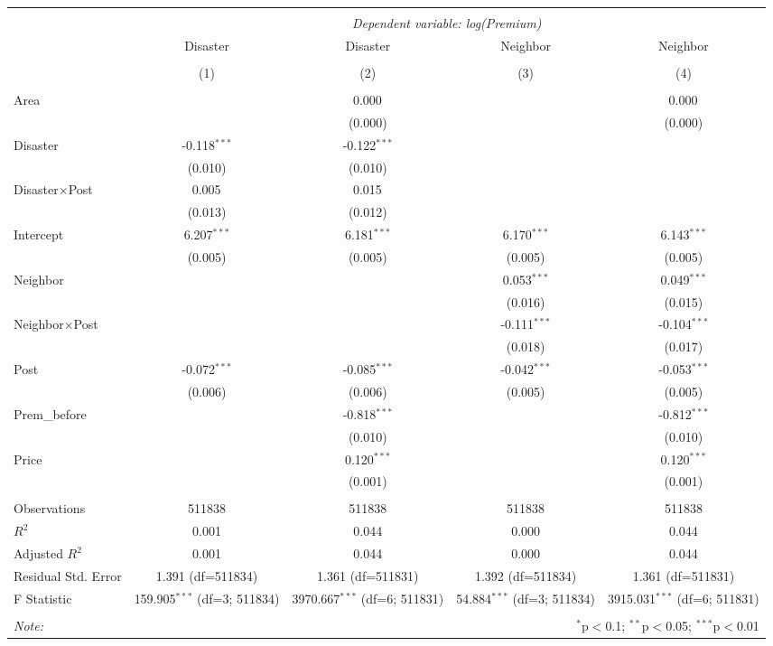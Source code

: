 
\begin{tabular}{@{\extracolsep{5pt}}lcccc}
\\[-1.8ex]\hline
\hline \\[-1.8ex]
& \multicolumn{4}{c}{\textit{Dependent variable: log(Premium)}} \
\cr \cline{2-5}
\\[-1.8ex] & \multicolumn{1}{c}{Disaster} & \multicolumn{1}{c}{Disaster} & \multicolumn{1}{c}{Neighbor} & \multicolumn{1}{c}{Neighbor}  \\
\\[-1.8ex] & (1) & (2) & (3) & (4) \\
\hline \\[-1.8ex]
 Area & & 0.000$^{}$ & & 0.000$^{}$ \\
& & (0.000) & & (0.000) \\
 Disaster & -0.118$^{***}$ & -0.122$^{***}$ & & \\
& (0.010) & (0.010) & & \\
 Disaster$\times$Post & 0.005$^{}$ & 0.015$^{}$ & & \\
& (0.013) & (0.012) & & \\
 Intercept & 6.207$^{***}$ & 6.181$^{***}$ & 6.170$^{***}$ & 6.143$^{***}$ \\
& (0.005) & (0.005) & (0.005) & (0.005) \\
 Neighbor & & & 0.053$^{***}$ & 0.049$^{***}$ \\
& & & (0.016) & (0.015) \\
 Neighbor$\times$Post & & & -0.111$^{***}$ & -0.104$^{***}$ \\
& & & (0.018) & (0.017) \\
 Post & -0.072$^{***}$ & -0.085$^{***}$ & -0.042$^{***}$ & -0.053$^{***}$ \\
& (0.006) & (0.006) & (0.005) & (0.005) \\
 Prem\_before & & -0.818$^{***}$ & & -0.812$^{***}$ \\
& & (0.010) & & (0.010) \\
 Price & & 0.120$^{***}$ & & 0.120$^{***}$ \\
& & (0.001) & & (0.001) \\
\hline \\[-1.8ex]
 Observations & 511838 & 511838 & 511838 & 511838 \\
 $R^2$ & 0.001 & 0.044 & 0.000 & 0.044 \\
 Adjusted $R^2$ & 0.001 & 0.044 & 0.000 & 0.044 \\
 Residual Std. Error & 1.391 (df=511834) & 1.361 (df=511831) & 1.392 (df=511834) & 1.361 (df=511831) \\
 F Statistic & 159.905$^{***}$ (df=3; 511834) & 3970.667$^{***}$ (df=6; 511831) & 54.884$^{***}$ (df=3; 511834) & 3915.031$^{***}$ (df=6; 511831) \\
\hline
\hline \\[-1.8ex]
\textit{Note:} & \multicolumn{4}{r}{$^{*}$p$<$0.1; $^{**}$p$<$0.05; $^{***}$p$<$0.01} \\
\end{tabular}
